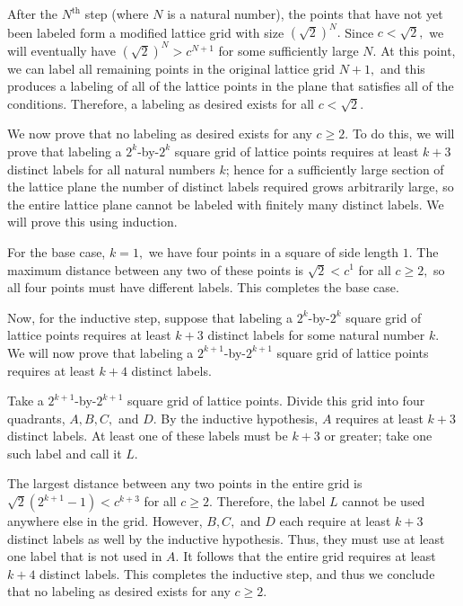 \begin{enumerate}
 After the $N^{\text{th}}$ step (where $N$ is a natural number), the points that have not yet been labeled form a modified lattice grid with size $\left(\sqrt{2}\right)^N.$ Since $c < \sqrt{2},$ we will eventually have $\left(\sqrt{2}\right)^N > c^{N+1}$ for some sufficiently large $N.$ At this point, we can label all remaining points in the original lattice grid $N+1,$ and this produces a labeling of all of the lattice points in the plane that satisfies all of the conditions. Therefore, a labeling as desired exists for all $c < \sqrt{2}.$

 We now prove that no labeling as desired exists for any $c\ge 2.$ To do this, we will prove that labeling a $2^k$-by-$2^k$ square grid of lattice points requires at least $k+3$ distinct labels for all natural numbers $k$; hence for a sufficiently large section of the lattice plane the number of distinct labels required grows arbitrarily large, so the entire lattice plane cannot be labeled with finitely many distinct labels. We will prove this using induction.

 For the base case, $k=1,$ we have four points in a square of side length $1.$ The maximum distance between any two of these points is $\sqrt{2} < c^1$ for all $c\ge 2,$ so all four points must have different labels. This completes the base case.

 Now, for the inductive step, suppose that labeling a $2^k$-by-$2^k$ square grid of lattice points requires at least $k+3$ distinct labels for some natural number $k.$ We will now prove that labeling a $2^{k+1}$-by-$2^{k+1}$ square grid of lattice points requires at least $k+4$ distinct labels.

 Take a $2^{k+1}$-by-$2^{k+1}$ square grid of lattice points. Divide this grid into four quadrants, $A, B, C,$ and $D.$ By the inductive hypothesis, $A$ requires at least $k+3$ distinct labels. At least one of these labels must be $k+3$ or greater; take one such label and call it $L.$

 The largest distance between any two points in the entire grid is $\sqrt{2}\left(2^{k+1} - 1\right) < c^{k+3}$ for all $c\ge 2.$ Therefore, the label $L$ cannot be used anywhere else in the grid. However, $B, C,$ and $D$ each require at least $k+3$ distinct labels as well by the inductive hypothesis. Thus, they must use at least one label that is not used in $A.$ It follows that the entire grid requires at least $k+4$ distinct labels. This completes the inductive step, and thus we conclude that no labeling as desired exists for any $c\ge 2.$


\end{enumerate}
